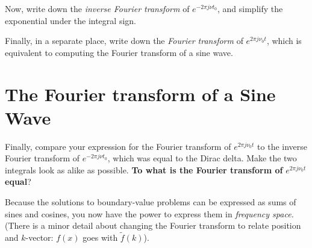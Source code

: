 \documentclass[10pt]{article}
\begin{document}
Now, write down the \textit{inverse Fourier transform} of $e^{-2\pi j \nu t_0}$, and simplify the exponential under the integral sign. \\ \vspace{1.5cm}

Finally, in a separate place, write down the \textit{Fourier transform} of $e^{2\pi j \nu_0 t}$, which is equivalent to computing the Fourier transform of a sine wave.

\section{The Fourier transform of a Sine Wave}

Finally, compare your expression for the Fourier transform of $e^{2\pi j \nu_0 t}$ to the inverse Fourier transform of $e^{-2\pi j \nu t_0}$, which was equal to the Dirac delta.  Make the two integrals look as alike as possible.  \textbf{To what is the Fourier transform of} $e^{2\pi j \nu_0 t}$ \textbf{equal}? \\ \vspace{1cm}

Because the solutions to boundary-value problems can be expressed as sums of sines and cosines, you now have the power to express them in \textit{frequency space.}  (There is a minor detail about changing the Fourier transform to relate position and $k$-vector: $f(x)$ goes with $\widetilde{f}(k)$).
\end{document}
